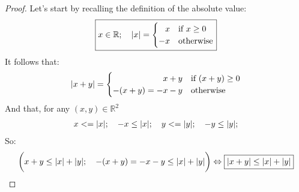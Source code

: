 \documentclass[solutions.tex]{subfiles}
\begin{document}
\begin{proof} Let's start by recalling the definition of the absolute
value:
\begin{equation*} \begin{aligned}
	\boxed{x\in\mathbb{R};\quad \abs{x} =
		\begin{cases}
			\hfill x & \text{if $x \ge 0$} \\
			-x & \text{otherwise}
		\end{cases}}
\end{aligned} \end{equation*}
It follows that:
\begin{equation*} \begin{aligned}
	\abs{x+y} =
		\begin{cases}
			\hfill x+y & \text{if $(x+y) \ge 0$} \\
			-(x+y)=-x-y & \text{otherwise}
		\end{cases}
\end{aligned} \end{equation*}
And that, for any $(x, y)\in\mathbb{R}^2$
\begin{equation*} \begin{aligned}
	x <= \lvert x \rvert;\quad -x \leq \lvert x \rvert;\quad
		y <= \lvert y \rvert;\quad -y \leq \lvert y \rvert;
\end{aligned} \end{equation*}
So:
\begin{equation*} \begin{aligned}
	\biggl(x+y \le \lvert x \rvert+\lvert y \rvert;\quad
	-(x+y) = -x-y \le \lvert x \rvert+\lvert y \rvert\biggr)
	\Leftrightarrow\boxed{\lvert x+y \rvert\le\lvert x \rvert+\lvert y \rvert}
\end{aligned} \end{equation*}
\end{proof}
\end{document}
